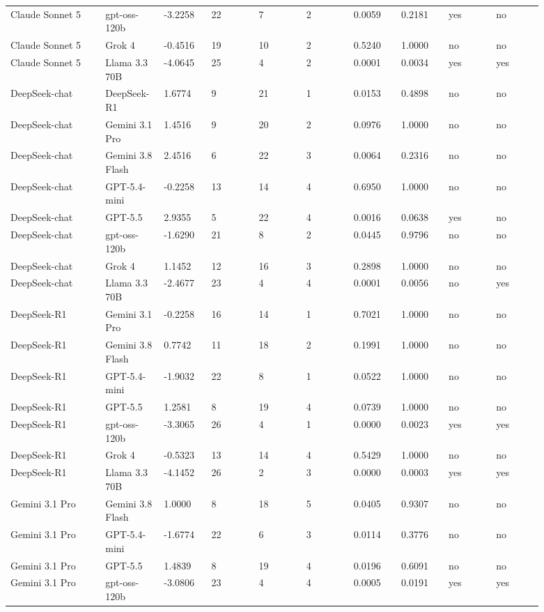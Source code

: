 \begin{landscape}
\begin{longtable}{p{0.162\linewidth}p{0.081\linewidth}p{0.081\linewidth}p{0.081\linewidth}p{0.081\linewidth}p{0.081\linewidth}p{0.081\linewidth}p{0.081\linewidth}p{0.081\linewidth}p{0.081\linewidth}}
Claude Sonnet 5 & gpt-oss-120b & -3.2258 & 22 & 7 & 2 & 0.0059 & 0.2181 & yes & no \\
Claude Sonnet 5 & Grok 4 & -0.4516 & 19 & 10 & 2 & 0.5240 & 1.0000 & no & no \\
Claude Sonnet 5 & Llama 3.3 70B & -4.0645 & 25 & 4 & 2 & 0.0001 & 0.0034 & yes & yes \\
DeepSeek-chat & DeepSeek-R1 & 1.6774 & 9 & 21 & 1 & 0.0153 & 0.4898 & no & no \\
DeepSeek-chat & Gemini 3.1 Pro & 1.4516 & 9 & 20 & 2 & 0.0976 & 1.0000 & no & no \\
DeepSeek-chat & Gemini 3.8 Flash & 2.4516 & 6 & 22 & 3 & 0.0064 & 0.2316 & no & no \\
DeepSeek-chat & GPT-5.4-mini & -0.2258 & 13 & 14 & 4 & 0.6950 & 1.0000 & no & no \\
DeepSeek-chat & GPT-5.5 & 2.9355 & 5 & 22 & 4 & 0.0016 & 0.0638 & yes & no \\
DeepSeek-chat & gpt-oss-120b & -1.6290 & 21 & 8 & 2 & 0.0445 & 0.9796 & no & no \\
DeepSeek-chat & Grok 4 & 1.1452 & 12 & 16 & 3 & 0.2898 & 1.0000 & no & no \\
DeepSeek-chat & Llama 3.3 70B & -2.4677 & 23 & 4 & 4 & 0.0001 & 0.0056 & no & yes \\
DeepSeek-R1 & Gemini 3.1 Pro & -0.2258 & 16 & 14 & 1 & 0.7021 & 1.0000 & no & no \\
DeepSeek-R1 & Gemini 3.8 Flash & 0.7742 & 11 & 18 & 2 & 0.1991 & 1.0000 & no & no \\
DeepSeek-R1 & GPT-5.4-mini & -1.9032 & 22 & 8 & 1 & 0.0522 & 1.0000 & no & no \\
DeepSeek-R1 & GPT-5.5 & 1.2581 & 8 & 19 & 4 & 0.0739 & 1.0000 & no & no \\
DeepSeek-R1 & gpt-oss-120b & -3.3065 & 26 & 4 & 1 & 0.0000 & 0.0023 & yes & yes \\
DeepSeek-R1 & Grok 4 & -0.5323 & 13 & 14 & 4 & 0.5429 & 1.0000 & no & no \\
DeepSeek-R1 & Llama 3.3 70B & -4.1452 & 26 & 2 & 3 & 0.0000 & 0.0003 & yes & yes \\
Gemini 3.1 Pro & Gemini 3.8 Flash & 1.0000 & 8 & 18 & 5 & 0.0405 & 0.9307 & no & no \\
Gemini 3.1 Pro & GPT-5.4-mini & -1.6774 & 22 & 6 & 3 & 0.0114 & 0.3776 & no & no \\
Gemini 3.1 Pro & GPT-5.5 & 1.4839 & 8 & 19 & 4 & 0.0196 & 0.6091 & no & no \\
Gemini 3.1 Pro & gpt-oss-120b & -3.0806 & 23 & 4 & 4 & 0.0005 & 0.0191 & yes & yes \\

\end{longtable}
\end{landscape}
